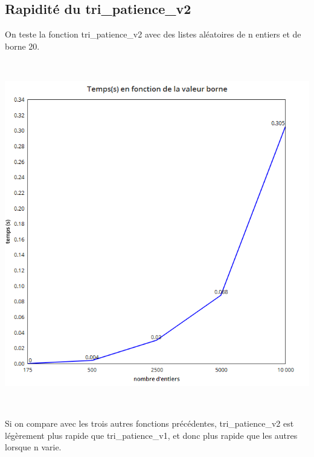 \documentclass[a4paper, 12pt]{article}
\begin{document}
\subsection{Rapidité du tri\_patience\_v2}

On teste la fonction tri\_patience\_v2 avec des listes aléatoires de n entiers et de borne 20.

~


\begin{center}
\includegraphics[scale=0.25]{trip2N.png}
\end{center}
~

Si on compare avec les trois autres fonctions précédentes, tri\_patience\_v2 est légèrement plus rapide que tri\_patience\_v1, et donc plus rapide que les autres lorsque n varie.

~
\end{document}
